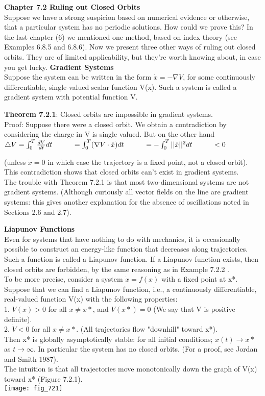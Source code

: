 \documentclass{article}
\newcommand\tab[1][1cm]{\hspace*{#1}}
\begin{document}
\textbf {Chapter 7.2 Ruling out Closed Orbits} \\
Suppose we have a strong suspicion based on numerical evidence or otherwise, that a particular system has no periodic solutions. How could we prove this? In the last chapter (6) we mentioned one method, based on index theory (see Examples 6.8.5 and 6.8.6). Now we present three other ways of ruling out closed orbits. They are of limited applicability, but they're worth knowing about, in case you get lucky. 
\textbf{Gradient Systems}\\ \tab
Suppose the system can be written in the form $\dot{x}=-\nabla V$, for some continuously differentiable, single-valued scalar function V(x). Such a system is called a gradient system with potential function V.

\textbf {Theorem 7.2.1}: Closed orbits are impossible in gradient systems. \\ \tab
Proof: Suppose there were a closed orbit. We obtain a contradiction by considering the charge in V is single valued. But on the other hand \\ \tab
$\triangle V = \int_{0}^{T} \frac{dV}{dt} dt \\ \tab
= \int_{0}^{T} (\nabla V \cdot \dot{x}) dt \\ \tab
= -\int_{0}^{T} ||\dot{x}||^{2}dt \\ \tab
<0$

(unless $\dot{x}=0$ in which case the trajectory is a fixed point, not a closed orbit). This contradiction shows that closed orbits can't exist in gradient systems. \\ \tab
The trouble with Theorem 7.2.1 is that most two-dimensional systems are not gradient systems. (Although curiously all vector fields on the line are gradient systems: this gives another explanation for the absence of oscillations noted in Sections 2.6 and 2.7). 

\textbf {Liapunov Functions} \\ \tab
Even for systems that have nothing to do with mechanics, it is occasionally possible to construct an energy-like function that decreases along trajectories. Such a function is called a Liapunov function. If a Liapunov function exists, then closed orbits are forbidden, by the same reasoning as in Example 7.2.2 . \\ \tab
To be more precise, consider a system $\dot{x}=f(x)$ with a fixed point at x*. Suppose that we can find a Liapunov function, i.e., a continuously differentiable, real-valued function V(x) with the following properties: \\ \tab
1. $V(x)>0$ for all $x \neq x*$, and $V(x*)=0$ (We say that V is positive definite). \\ \tab
2. $\dot{V}<0$ for all $x \neq x*$. (All trajectories flow "downhill" toward x*). \\
Then x* is globally asymptotically stable: for all initial conditions; $x(t) \to x*$ as $t \to \infty$. In particular the system has no closed orbits. (For a proof, see Jordan and Smith 1987). \\ \tab
The intuition is that all trajectories move monotonically down the graph of V(x) toward x* (Figure 7.2.1). \\
\texttt{[image: fig\_721]}
\end{document}
